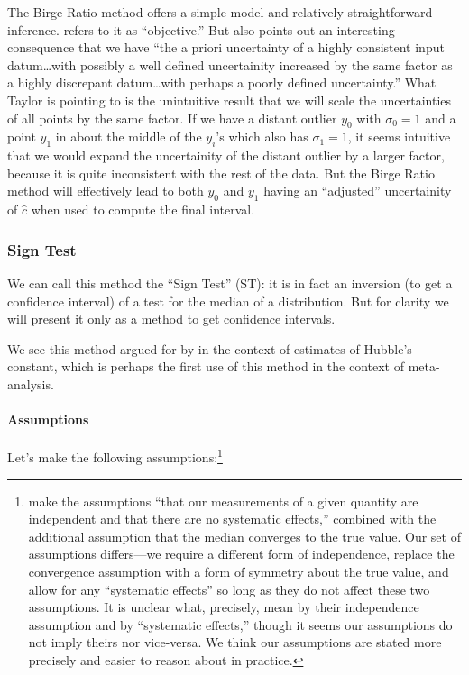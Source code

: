 \documentclass[letterpaper,12pt]{article}
\begin{document}
The Birge Ratio method offers a simple model and relatively straightforward inference. \citet{taylor1982numerical} refers to it as ``objective.'' But \citet{taylor1982numerical} also points out an interesting consequence that we have ``the a priori uncertainty of a highly consistent input datum\ldots with possibly a well defined uncertainity increased by the same factor as a highly discrepant datum\ldots with perhaps a poorly defined uncertainty.'' What Taylor is pointing to is the unintuitive result that we will scale the uncertainties of all points by the same factor. If we have a distant outlier $y_0$ with $\sigma_0=1$ and a point $y_1$ in about the middle of the $y_i$'s which also has $\sigma_1=1$, it seems intuitive that we would expand the uncertainity of the distant outlier by a larger factor, because it is quite inconsistent with the rest of the data. But the Birge Ratio method will effectively lead to both $y_0$ and $y_1$ having an ``adjusted'' uncertainity of $\hat c$ when used to compute the final interval.

\subsubsection{Sign Test}\label{sec:st}

We can call this method the ``Sign Test'' (ST): it is in fact an inversion (to get a confidence interval) of a test for the median of a distribution. But for clarity we will present it only as a method to get confidence intervals.

We see this method argued for by \citet{gott2001median} in the context of estimates of Hubble's constant, which is perhaps the first use of this method in the context of meta-analysis.

\paragraph{Assumptions}\label{assumptions-3}

Let's make the following assumptions:\footnote{
  \citet{gott2001median} make the assumptions ``that our measurements of a given quantity are independent and that there are no systematic effects,'' combined with the additional assumption that the median converges to the true value. Our set of assumptions differs---we require a different form of independence, replace the convergence assumption with a form of symmetry about the true value, and allow for any ``systematic effects'' so long as they do not affect these two assumptions. It is unclear what, precisely, \citet{gott2001median} mean by their independence assumption and by ``systematic effects,'' though it seems our assumptions do not imply theirs nor vice-versa. We think our assumptions are stated more precisely and easier to reason about in practice.
}
\end{document}
